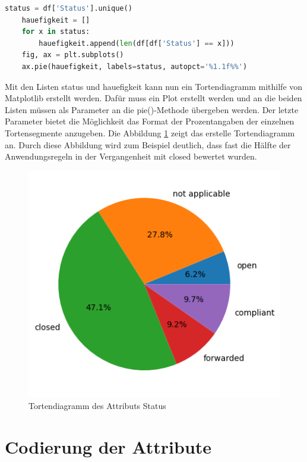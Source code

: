 \begin{lstlisting}[language = python, caption={Visualisierung des Attributs Status},captionpos=b, label = lst:StatusPie, floatplacement=H]
    status = df['Status'].unique()
    hauefigkeit = []
    for x in status:
        hauefigkeit.append(len(df[df['Status'] == x]))
    fig, ax = plt.subplots()
    ax.pie(hauefigkeit, labels=status, autopct='%1.1f%%')
\end{lstlisting}

Mit den Listen \glqq status\grqq{} und \glqq hauefigkeit\grqq{} kann nun ein Tortendiagramm mithilfe von Matplotlib erstellt werden.
Dafür muss ein Plot erstellt werden und an die beiden Listen müssen als Parameter an die pie()-Methode übergeben werden.
Der letzte Parameter bietet die Möglichkeit das Format der Prozentangaben der einzelnen Tortensegmente anzugeben. 
Die Abbildung \ref*{fig:StatusPie} zeigt das erstelle Tortendiagramm an. Durch diese Abbildung wird zum Beispiel deutlich, dass fast die Hälfte der 
Anwendungsregeln in der Vergangenheit mit \glqq closed\grqq{} bewertet wurden.

\begin{figure}[H]
    \centering
    \includegraphics[width = \textwidth/2]{abbildungen/Status.png}
    \caption{Tortendiagramm des Attributs Status}
    \label{fig:StatusPie}
\end{figure}

\section{Codierung der Attribute}
